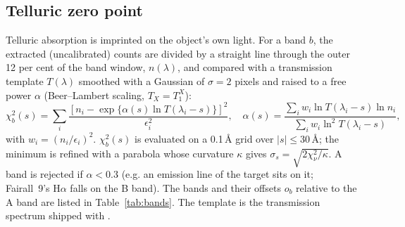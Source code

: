 \subsection{Telluric zero point}
\label{sec:diag_tell}
Telluric absorption is imprinted on the object's own light. For a band $b$, the extracted (uncalibrated) counts are
divided by a straight line through the outer 12 per cent of the band window, $n(\lambda)$, and compared with a
transmission template $T(\lambda)$ smoothed with a Gaussian of $\sigma=2$ pixels and raised to a free power $\alpha$
(Beer--Lambert scaling, $T_X=T_1^{X}$):
\begin{equation}
\chi^2_b(s) = \sum_i \frac{\left[n_i - \exp\{\alpha(s)\ln T(\lambda_i - s)\}\right]^2}{\epsilon_i^2},\quad
\alpha(s) = \frac{\sum_i w_i \ln T(\lambda_i-s) \ln n_i}{\sum_i w_i \ln^2 T(\lambda_i-s)},
\label{eq:tell}
\end{equation}
with $w_i=(n_i/\epsilon_i)^2$. $\chi^2_b(s)$ is evaluated on a 0.1\,\AA{} grid over $|s|\le30$\,\AA{}; the minimum is
refined with a parabola whose curvature $\kappa$ gives $\sigma_s=\sqrt{2\chi^2_\nu/\kappa}$. A band is rejected if
$\alpha<0.3$ (e.g. an emission line of the target sits on it; Fairall~9's H$\alpha$ falls on the B band).
The bands and their offsets $o_b$ relative to the A band are listed in Table~\ref{tab:bands}. The template is the
transmission spectrum shipped with \banzai{}.
